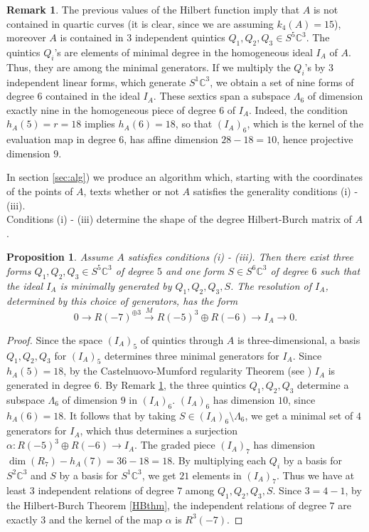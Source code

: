 \documentclass{amsart}
\newcommand{\C}{\mathbb{C}}
\newtheorem{prop0}[thm0]{Proposition}
\theoremstyle{definition}
\newtheorem{rem0}[thm0]{Remark}
\begin{document}
\begin{rem0}\label{generic}The previous values of the Hilbert function imply that $A$ is not contained in quartic curves (it is clear, since we are assuming $k_4(A)=15$),
moreover $A$ is contained in $3$ independent quintics  $Q_{1}, Q_{2}, Q_{3}\in S^{5} \C^{3} $.
The quintics $Q_i$'s are elements of minimal degree in the homogeneous ideal $I_A$ of $A$. Thus, they are among the minimal generators.
If we multiply the $Q_i$'s by $3$ independent linear forms, which generate $S^{1} \C^{3}$, we obtain a set of nine forms of degree $6$ 
contained in the ideal $I_A$. These sextics span a subspace $\Lambda_6$ of dimension exactly nine in the homogeneous piece of
 degree $6$ of $I_A$. Indeed, the condition $ h_{A}(5) = r =18 $ implies $h_{A}(6)=18$, so that $(I_A)_6$, which is the kernel of the
 evaluation map in degree $6$, has affine dimension $28-18=10$, hence projective dimension $9$. 
 \end{rem0}
 
In section \ref{sec:alg}) we produce an algorithm which, starting with the coordinates of the points of $A$, texts
whether or not $A$ satisfies the generality conditions (i) - (iii).\\
Conditions (i) - (iii) determine the shape of the degree Hilbert-Burch matrix of $A$.

\begin{prop0}\label{HBA} Assume $A$ satisfies conditions (i) - (iii). Then there exist three forms $Q_{1}, Q_{2}, Q_{3}\in S^{5} \C^{3} $ of degree $5$ 
and one form $ S \in S^{6} \C^{3} $ of degree $6$ such that the ideal $I_A$ is minimally generated by $Q_1,Q_2,Q_3,S$. The resolution
of $I_A$, determined by this choice of generators, has the form
$$ 0 \longrightarrow R(-7)^{\oplus 3} \xrightarrow M  R(-5)^{3} \oplus R(-6) \longrightarrow I_A \longrightarrow 0.$$
\end{prop0}
\begin{proof} Since the space $(I_A)_5$ of quintics through $A$ is three-dimensional, a basis $Q_{1}, Q_{2}, Q_{3}$ for $(I_A)_5$ determines three
minimal generators for $I_A$. Since $ h_{A}(5) =18$, by the Castelnuovo-Mumford regularity Theorem (see \cite{Castelnuovo93}) $I_A$ is generated in degree $6$.
By Remark \ref{generic}, the three quintics $Q_{1}, Q_{2}, Q_{3}$ determine a subspace $\Lambda_6$ 
 of dimension $9$ in $(I_A)_6$. $(I_A)_6$ has dimension $10$, since $h_A(6)=18$.
It follows that by taking  $S\in (I_A)_6 \setminus \Lambda_6$, we get a minimal set of $4$ generators for $I_A$, which thus determines a surjection
$\alpha: R(-5)^{3} \oplus R(-6) \longrightarrow I_A$. The graded piece $(I_A)_7$ has dimension $\dim(R_7)-h_A(7)=36-18=18$. By multiplying each
$Q_i$ by a basis for $S^{2} \C^{3}$ and $S$ by a basis for $S^{1} \C^{3}$, we get $21$ elements in $(I_A)_7$. Thus we have at least $3$
independent relations of degree $7$ among $Q_{1}, Q_{2}, Q_{3},S$. Since $3=4-1$, by the Hilbert-Burch Theorem \ref{HBthm}, the independent relations
of degree $7$ are exactly $3$ and the kernel of the map $\alpha$ is $R^3(-7)$.
\end{proof}
\end{document}
